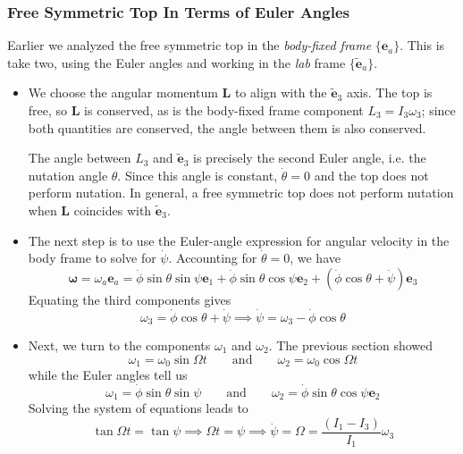 \documentclass[11pt, a4paper]{article}
\newcommand{\eqtext}[1]{\qquad \text{#1} \qquad}
\newcommand{\e}{\bm{e}} %
\begin{document}
\subsubsection{Free Symmetric Top In Terms of Euler Angles}
Earlier we analyzed the free symmetric top in the \textit{body-fixed frame} $ \{\e_{a} \} $. This is take two, using the Euler angles and working in the \textit{lab} frame $ \{\tilde{\e}_{a} \} $.
\begin{itemize}
	\item We choose the angular momentum $ \mathbf{L} $ to align with the $ \tilde{\e}_{3} $ axis. The top is free, so $ \bm{L} $ is conserved, as is the body-fixed frame component $ L_{3} = I_{3} \omega_{3} $; since both quantities are conserved, the angle between them is also conserved. 
	
	The angle between $ L_{3} $ and $ \tilde{\e}_{3} $ is precisely the second Euler angle, i.e. the nutation angle $ \theta $. Since this angle is constant, $ \dot{\theta} = 0 $ and the top does not perform nutation. In general, a free symmetric top does not perform nutation when $ \bm{L} $ coincides with $ \tilde{\e}_{3} $.
	
	\item The next step is to use the Euler-angle expression for angular velocity in the body frame to solve for $ \dot{\psi} $. Accounting for $ \dot{\theta} = 0 $, we have
	\begin{equation*}
		\bm{\omega} = \omega_{a} \e_{a} = \dot \phi \sin \theta \sin \psi \e_{1} + \dot{\phi} \sin \theta \cos \psi \e_{2} + (\dot{\phi } \cos \theta + \dot{\psi} ) \e_{3}
	\end{equation*}
	Equating the third components gives
	\begin{equation*}
		\omega_{3} = \dot{\phi } \cos \theta + \dot{\psi} \implies \dot{\psi} = \omega_{3} - \dot{\phi } \cos \theta 
	\end{equation*}
	
	\item Next, we turn to the components $ \omega_{1} $ and $ \omega_{2} $. The previous section showed 
	\begin{equation*}
		\omega_{1} = \omega_{0}\sin \Omega t \eqtext{and} \omega_{2} = \omega_{0}\cos \Omega t
	\end{equation*}
	while the Euler angles tell us
	\begin{equation*}
		\omega_{1} = \dot \phi \sin \theta \sin \psi \eqtext{and} \omega_{2} = \dot{\phi} \sin \theta \cos \psi \e_{2}
	\end{equation*} 
	Solving the system of equations leads to 
	\begin{equation*}
		\tan \Omega t = \tan \psi \implies \Omega t = \psi \implies \dot{\psi} = \Omega = \frac{(I_{1} - I_{3})}{I_{1}} \omega_{3}
	\end{equation*}
	

\end{itemize}
\end{document}
